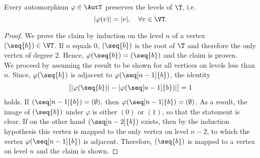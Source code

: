 \begin{thm}\label{thm:Levels are preserved}
Every automorphism $\varphi\in\AutT$ preserves the levels of $\T$, i.e.
\begin{equation*}
\lvert \varphi(v)\rvert=\lvert v\rvert,\quad\forall v\in\VT.
\end{equation*}
\end{thm}

\begin{proof}
We prove the claim by induction on the level $n$ of a vertex $(\seq{b})\in\VT$. If $n$ equals 0, $(\seq{b})$ is the root of $\T$ and therefore the only vertex of degree 2. Hence, $\varphi(\seq{b})=(\seq{b})$ and the claim is proven.\\
We proceed by assuming the result to be shown for all vertices on levels less than $n$. Since, $\varphi(\seq{b})$ is adjacent to $\varphi(\seq[n-1]{b})$, the identity
\begin{equation*}
\big\lvert\lvert\varphi(\seq{b})\rvert-\lvert\varphi(\seq[n-1]{b})\rvert\big\rvert=1
\end{equation*}
holds. If $(\seq[n-1]{b})=(\emptyset),$ then $\varphi(\seq[n-1]{b})=(\emptyset)$. As a result, the image of $(\seq{b})$ under $\varphi$ is either $(0)$ or $(1)$, so that the statement is clear. If on the other hand $(\seq[n-2]{b})$ exists, then by the induction hypothesis this vertex is mapped  to the only vertex on level $n-2$, to which the vertex $\varphi(\seq[n-1]{b})$ is adjacent. Therefore, $(\seq{b})$ is mapped to a vertex on level $n$ and the claim is shown.
\end{proof}

